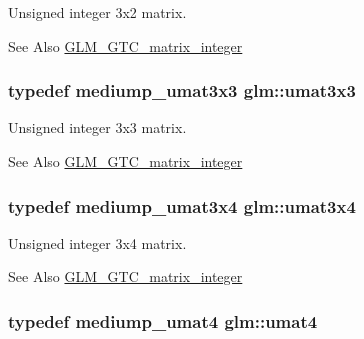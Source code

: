 Unsigned integer 3x2 matrix. \begin{DoxySeeAlso}{See Also}
\hyperlink{group__gtc__matrix__integer}{G\-L\-M\-\_\-\-G\-T\-C\-\_\-matrix\-\_\-integer} 
\end{DoxySeeAlso}
\hypertarget{group__gtc__matrix__integer_gab80b6501ba1b2c40119a0f2d256f4c97}{
\subsubsection[{umat3x3}]{\setlength{\rightskip}{0pt plus 5cm}typedef mediump\-\_\-umat3x3 {\bf glm\-::umat3x3}}}\label{group__gtc__matrix__integer_gab80b6501ba1b2c40119a0f2d256f4c97}
Unsigned integer 3x3 matrix. \begin{DoxySeeAlso}{See Also}
\hyperlink{group__gtc__matrix__integer}{G\-L\-M\-\_\-\-G\-T\-C\-\_\-matrix\-\_\-integer} 
\end{DoxySeeAlso}
\hypertarget{group__gtc__matrix__integer_ga5410857d098a989a30b4017100bc2ff7}{
\subsubsection[{umat3x4}]{\setlength{\rightskip}{0pt plus 5cm}typedef mediump\-\_\-umat3x4 {\bf glm\-::umat3x4}}}\label{group__gtc__matrix__integer_ga5410857d098a989a30b4017100bc2ff7}
Unsigned integer 3x4 matrix. \begin{DoxySeeAlso}{See Also}
\hyperlink{group__gtc__matrix__integer}{G\-L\-M\-\_\-\-G\-T\-C\-\_\-matrix\-\_\-integer} 
\end{DoxySeeAlso}
\hypertarget{group__gtc__matrix__integer_ga7ae562000d8a8d193e9f93cf51e2e113}{
\subsubsection[{umat4}]{\setlength{\rightskip}{0pt plus 5cm}typedef mediump\-\_\-umat4 {\bf glm\-::umat4}}}\label{group__gtc__matrix__integer_ga7ae562000d8a8d193e9f93cf51e2e113}
